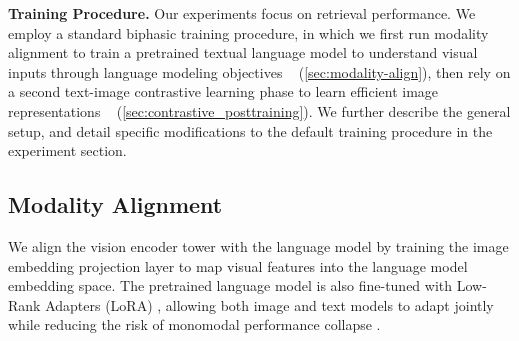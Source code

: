 



\noindent\textbf{Training Procedure.} Our experiments focus on retrieval performance. We employ a standard biphasic training procedure, in which we first run modality alignment to train a pretrained textual language model to understand visual inputs through language modeling objectives  ~\citep{liu2023visualinstructiontuning} (\autoref{sec:modality-align}), then rely on a second text-image contrastive learning phase to learn efficient image representations ~\citep{radford2021learningtransferablevisualmodels} (\autoref{sec:contrastive_posttraining}). We further describe the general setup, and detail specific modifications to the default training procedure in the experiment section.

\subsection{Modality Alignment}
\label{sec:modality-align}
We align the vision encoder tower with the language model by training the image embedding projection layer to map visual features into the language model embedding space. The pretrained language model is also fine-tuned with Low-Rank Adapters (LoRA) \citep{hu2021loralowrankadaptationlarge}, allowing both image and text models to adapt jointly while reducing the risk of monomodal performance collapse \citep{alayrac2022flamingovisuallanguagemodel,liu2023visualinstructiontuning,laurençon2024mattersbuildingvisionlanguagemodels,mckinzie2024mm1methodsanalysis,marafioti2025smolvlmredefiningsmallefficient}.

